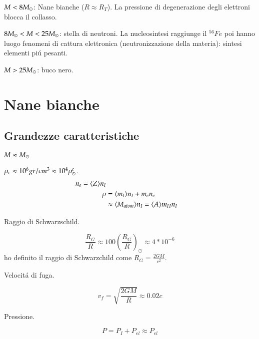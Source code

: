\begin{itemize*}
\item $M<8M_{\odot}$: Nane bianche ($R\approx R_T$).
La pressione di degenerazione degli elettroni blocca il collasso.

\item $8M_{\odot}<M<25M_{\odot}$: stella di neutroni.
La nucleosintesi raggiunge il $^{56}Fe$  poi hanno luogo fenomeni di cattura elettronica (neutronizzazione della materia): sintesi elementi pi\'u pesanti.

\item $M>25M_{\odot}$: buco nero.

\end{itemize*}


\section{Nane bianche}

\subsection{Grandezze caratteristiche}

\begin{itemize*}
\item $M\approx M_{\odot}$
\item $\rho_c\approx10^6gr/cm^3\approx10^4\rho_{\odot}^c$.
\begin{align*}
n_e=\langle Z \rangle n_I\\
\rho&=\langle m_I \rangle n_I+m_en_e\\
&\approx\langle M_{atom} \rangle n_I=\langle A \rangle m_Hn_I
\end{align*}

\item Raggio di Schwarzschild.

\begin{equation*}
\frac{R_G}{R}\approx100(\frac{R_G}{R})_{\odot}\approx4*10^{-6}
\end{equation*}
ho definito il raggio di Schwarzchild come $R_G=\frac{2GM}{c^2}$.
\item Velocit\'a di fuga.

\begin{equation*}
v_f=\sqrt{\frac{2GM}{R}}\approx0.02 c
\end{equation*}

\item Pressione.

\begin{equation*}
P=P_I+P_{el}\approx P_{el}
\end{equation*}
\end{itemize*}


